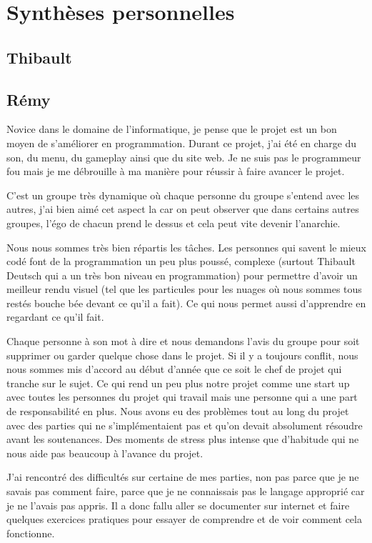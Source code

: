 \documentclass[11pt]{report}
\begin{document}
\chapter{Synthèses personnelles}

\section{Thibault}

\section{Rémy}

Novice dans le domaine de l'informatique, je pense que le projet est un bon moyen de s'améliorer en programmation. Durant ce projet, j'ai été en charge du son, du menu, du gameplay ainsi que du site web. Je ne suis pas le programmeur fou mais je me débrouille à ma manière pour réussir à faire avancer le projet.

C’est un groupe très dynamique où chaque personne du groupe s’entend avec les autres, j’ai bien aimé cet aspect la car on peut observer que dans certains autres groupes, l’égo de chacun prend le dessus et cela peut vite devenir l’anarchie.

Nous nous sommes très bien répartis les tâches. Les personnes qui savent le mieux codé font de la programmation un peu plus poussé, complexe (surtout Thibault Deutsch qui a un très bon niveau en programmation) pour permettre d’avoir un meilleur rendu visuel (tel que les particules pour les nuages où nous sommes tous restés bouche bée devant ce qu’il a fait). Ce qui nous permet aussi d’apprendre en regardant ce qu’il fait.

Chaque personne à son mot à dire et nous demandons l’avis du groupe pour soit supprimer ou garder quelque chose dans le projet. Si il y a toujours conflit, nous nous sommes mis d’accord au début d’année que ce soit le chef de projet qui tranche sur le sujet. Ce qui rend un peu plus notre projet comme une start up avec toutes les personnes du projet qui travail mais une personne qui a une part de responsabilité en plus.
Nous avons eu des problèmes tout au long du projet avec des parties qui ne s’implémentaient pas et qu’on devait absolument résoudre avant les soutenances. Des moments de stress plus intense que d’habitude qui ne nous aide pas beaucoup à l’avance du projet.

J’ai rencontré des difficultés sur certaine de mes parties, non pas parce que je ne savais pas comment faire, parce que je ne connaissais pas le langage approprié car je ne l’avais pas appris. Il a donc fallu aller se documenter sur internet et faire quelques exercices pratiques pour essayer de comprendre et de voir comment cela fonctionne.
\end{document}
